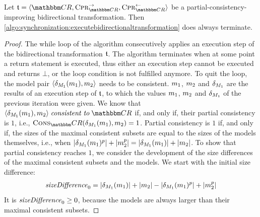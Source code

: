 \begin{lemma} %
    \label{lemma:bidirectionaltransformationtermination}
    Let $\transformation{t} = \tupled{\consistencyrelationset{CR}, \consistencypreservationrule{\consistencyrelationset{CR}}^{\rightarrow}, \consistencypreservationrule{\consistencyrelationset{CR}}^{\leftarrow}}$ be a partial-consistency-improving bidirectional transformation.
    Then \autoref{algo:synchronization:executebidirectionaltransformation} does always terminate.
\end{lemma}
\begin{proof}
    The while loop of the algorithm consecutively applies an execution step of the bidirectional transformation $\mathfrak{t}$.
    The algorithm terminates when at some point a return statement is executed, thus either an execution step cannot be executed and returns $\bot$, or the loop condition is not fulfilled anymore.
    To quit the loop, the model pair $\langle \delta_{M_{1}}(m_{1}), m_{2} \rangle$ needs to be consistent.
    $m_{1}$, $m_{2}$ and $\delta_{M_{1}}$ are the results of an execution step of $\mathfrak{t}$, to which the values $m_{1}$, $m_{2}$ and $\delta_{M_{1}}$ of the previous iteration were given.
    We know that $\tupled{\change{\metamodel{M}{1}}(\model{m}{1}), \model{m}{2}} \consistenttomath \consistencyrelationset{CR}$ if, and only if, their partial consistency is $1$, i.e., $\function{Cons}_\consistencyrelationset{CR}(\change{\metamodel{M}{1}}(\model{m}{1}), \model{m}{2}) = 1$.
    Partial consistency is $1$ if, and only if, the sizes of the maximal consistent subsets are equal to the sizes of the models themselves, i.e., when $\lvert\delta_{M_{1}}(m_{1})^p\rvert + \lvert m_{2}^p\rvert = \lvert\delta_{M_{1}}(m_{1})\rvert + \lvert m_{2}\rvert$.
    To show that partial consistency reaches $1$, we consider the development of the size differences of the maximal consistent subsets and the models.
    We start with the initial size difference:
    \begin{align*}
        \mathit{sizeDifference}_0 = \lvert\delta_{M_{1}}(m_{1})\rvert + \lvert m_{2}\rvert - \lvert\delta_{M_{1}}(m_{1})^p\rvert + \lvert m_{2}^p\rvert
    \end{align*}
    It is $\mathit{sizeDifference}_0 \geq 0$, because the models are always larger than their maximal consistent subsets.

\end{proof}
